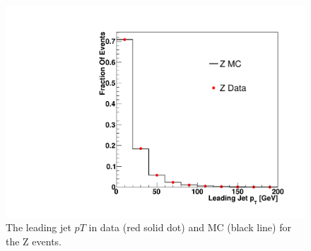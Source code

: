 \begin{figure}[!hbtp]
\centering
\includegraphics[width=.4\textwidth]{figures/ZjetpT.pdf}
\caption{The leading jet $pT$ %
in data (red solid dot) and MC (black line) for the Z events. }
\label{fig:jetveto_z}
\end{figure}




